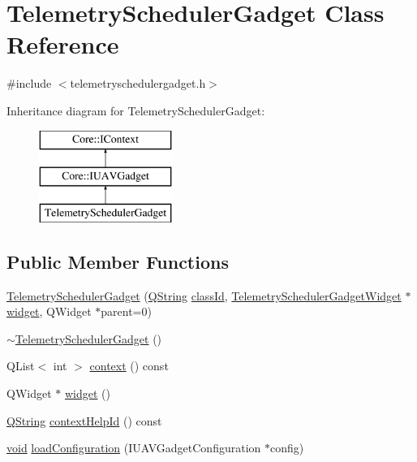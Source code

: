 \hypertarget{class_telemetry_scheduler_gadget}{\section{\-Telemetry\-Scheduler\-Gadget \-Class \-Reference}
\label{class_telemetry_scheduler_gadget}
}


{\ttfamily \#include $<$telemetryschedulergadget.\-h$>$}

\-Inheritance diagram for \-Telemetry\-Scheduler\-Gadget\-:\begin{figure}[H]
\begin{center}
\leavevmode
\includegraphics[height=3.000000cm]{class_telemetry_scheduler_gadget}
\end{center}
\end{figure}
\subsection*{\-Public \-Member \-Functions}
\begin{DoxyCompactItemize}
\item 
\hyperlink{group___telemetry_scheduler_gadget_plugin_gad6c9a0ecdc6864a13ced085537fef8de}{\-Telemetry\-Scheduler\-Gadget} (\hyperlink{group___u_a_v_objects_plugin_gab9d252f49c333c94a72f97ce3105a32d}{\-Q\-String} \hyperlink{group___core_plugin_ga3878fde66a57220608960bcc3fbeef2c}{class\-Id}, \hyperlink{class_telemetry_scheduler_gadget_widget}{\-Telemetry\-Scheduler\-Gadget\-Widget} $\ast$\hyperlink{group___telemetry_scheduler_gadget_plugin_gad2330b009cb0dafb40f51b3172b11568}{widget}, \-Q\-Widget $\ast$parent=0)
\item 
\hyperlink{group___telemetry_scheduler_gadget_plugin_ga045a9c869426c4d02e391a12282b19d7}{$\sim$\-Telemetry\-Scheduler\-Gadget} ()
\item 
\-Q\-List$<$ int $>$ \hyperlink{group___telemetry_scheduler_gadget_plugin_ga8e9cbd33ece042bd4191b34c57284b0a}{context} () const 
\item 
\-Q\-Widget $\ast$ \hyperlink{group___telemetry_scheduler_gadget_plugin_gad2330b009cb0dafb40f51b3172b11568}{widget} ()
\item 
\hyperlink{group___u_a_v_objects_plugin_gab9d252f49c333c94a72f97ce3105a32d}{\-Q\-String} \hyperlink{group___telemetry_scheduler_gadget_plugin_ga7a499df127457e721f0a7513e00c215b}{context\-Help\-Id} () const 
\item 
\hyperlink{group___u_a_v_objects_plugin_ga444cf2ff3f0ecbe028adce838d373f5c}{void} \hyperlink{group___telemetry_scheduler_gadget_plugin_gadd7b9b93eab48f561517b14555143819}{load\-Configuration} (\-I\-U\-A\-V\-Gadget\-Configuration $\ast$config)
\end{DoxyCompactItemize}


